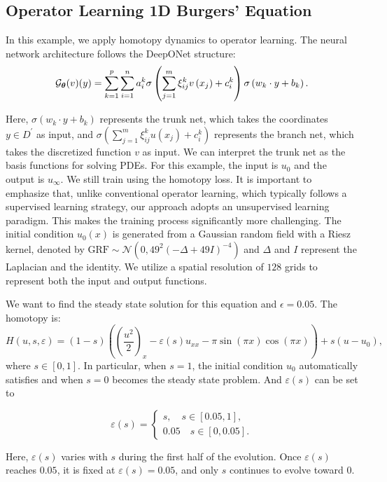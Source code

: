 \subsection{Operator Learning 1D Burgers' Equation}
\label{Ap:operator}
In this example, we apply homotopy dynamics to operator learning. The neural network architecture follows the DeepONet structure: \begin{equation}
\mathcal{G}_{\boldsymbol{\theta}}(v)(y) = \sum_{k=1}^p \sum_{i=1}^n a_i^k \sigma\left(\sum_{j=1}^m \xi_{i j}^k v\left(x_j\right)+c_i^k\right) \sigma\left(w_k \cdot y+b_k\right).
\end{equation}

Here, $\sigma\left(w_k \cdot y+b_k\right)$ represents the trunk net, which takes the coordinates $y \in D^{\prime}$ as input, and $\sigma\left(\sum_{j=1}^m \xi_{i j}^k u\left(x_j\right)+c_i^k\right)$ represents the branch net, which takes the discretized function $v$ as input. We can interpret the trunk net as the basis functions for solving PDEs. For this example, the input is $u_0$ and the output is $u_{\infty}$. We still train using the homotopy loss. It is important to emphasize that, unlike conventional operator learning, which typically follows a supervised learning strategy, our approach adopts an unsupervised learning paradigm. This makes the training process significantly more challenging. The initial condition $u_0(x)$ is generated from a Gaussian random field with a Riesz kernel, denoted by $\text{GRF} \sim 
\mathcal{N}\left(0,49^2(-\Delta+49I)^{-4}\right)$ and $\Delta$ and $I$ represent the Laplacian and the identity. We utilize a spatial resolution of $128$ grids to represent both the input and output functions.

We want to find the steady state solution for this equation and $\epsilon = 0.05$. The homotopy is:
\begin{equation}
    H(u,s,\varepsilon) = (1-s)\left(\left(\frac{u^2}{2}\right)_x - \varepsilon(s) u_{xx} -\pi \sin (\pi x) \cos (\pi x)\right) + s(u-u_0),
\end{equation}
where $s \in [0,1]$. In particular, when $s = 1$, the initial condition $u_0$ automatically satisfies and when $s = 0$ becomes the steady state problem. And $\varepsilon(s)$ can be set to




\begin{equation}
\varepsilon(s) = 
\left\{\begin{array}{l}
s, \quad s \in [0.05,1],\\
0.05 \quad s\in [0,0.05].
\end{array}\right.\label{eq:epsilon_t}
\end{equation}

Here, $\varepsilon(s)$ varies with $s$ during the first half of the evolution. Once $\varepsilon(s)$ reaches $0.05$, it is fixed at $\varepsilon(s) = 0.05$, and only $s$ continues to evolve toward $0$.







